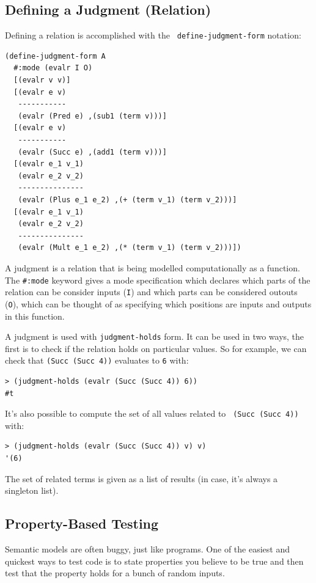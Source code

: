 \subsection{Defining a Judgment (Relation)}

Defining a relation is accomplished with the {\tt
  define-judgment-form} notation:
\begin{verbatim}
(define-judgment-form A
  #:mode (evalr I O)
  [(evalr v v)]
  [(evalr e v)
   -----------
   (evalr (Pred e) ,(sub1 (term v)))]
  [(evalr e v)
   -----------
   (evalr (Succ e) ,(add1 (term v)))]  
  [(evalr e_1 v_1)
   (evalr e_2 v_2)
   ---------------
   (evalr (Plus e_1 e_2) ,(+ (term v_1) (term v_2)))]
  [(evalr e_1 v_1)
   (evalr e_2 v_2)
   ---------------
   (evalr (Mult e_1 e_2) ,(* (term v_1) (term v_2)))])
\end{verbatim}

A judgment is a relation that is being modelled computationally as a
function.  The {\tt \#:mode} keyword gives a mode specification which
declares which parts of the relation can be consider inputs ({\tt I})
and which parts can be considered outouts ({\tt O}), which can be
thought of as specifying which positions are inputs and outputs in
this function.

A judgment is used with {\tt judgment-holds} form.  It can be used in
two ways, the first is to check if the relation holds on particular
values.  So for example, we can check that {\tt (Succ (Succ 4))}
evaluates to {\tt 6} with:
\begin{verbatim}
> (judgment-holds (evalr (Succ (Succ 4)) 6))
#t
\end{verbatim}
It's also possible to compute the set of all values related to {\tt
  (Succ (Succ 4))} with:
\begin{verbatim}
> (judgment-holds (evalr (Succ (Succ 4)) v) v)
'(6)
\end{verbatim}
The set of related terms is given as a list of results (in case, it's
always a singleton list).

\subsection{Property-Based Testing}

Semantic models are often buggy, just like programs.  One of the
easiest and quickest ways to test code is to state properties you
believe to be true and then test that the property holds for a bunch
of random inputs.

